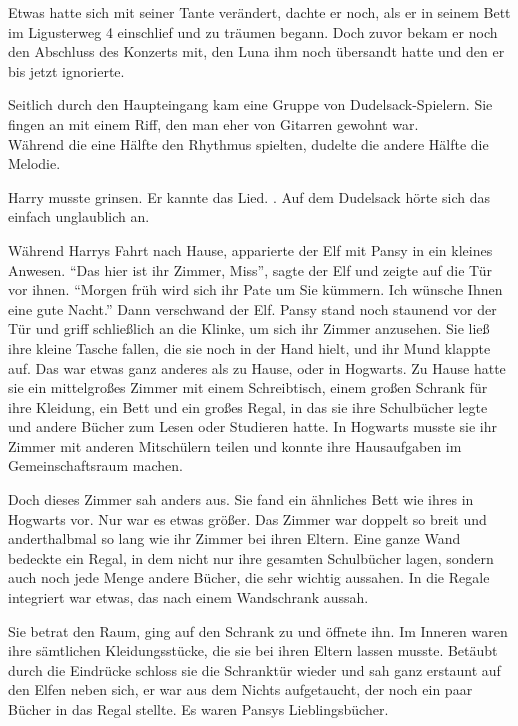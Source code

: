 Etwas hatte sich mit seiner Tante verändert, dachte er noch, als er in seinem Bett im Ligusterweg 4 einschlief und zu träumen begann. Doch zuvor bekam er noch den Abschluss des Konzerts mit, den Luna ihm noch übersandt hatte und den er bis jetzt ignorierte.

\begin{rueckblick}
Seitlich durch den Haupteingang kam eine Gruppe von Dudelsack-Spielern. Sie fingen an mit einem Riff, den man eher von Gitarren gewohnt war.\\
Während die eine Hälfte den Rhythmus spielten, dudelte die andere Hälfte die Melodie.
\end{rueckblick}

Harry musste grinsen. Er kannte das Lied. . Auf dem Dudelsack hörte sich das einfach unglaublich an.

\trenn

Während Harrys Fahrt nach Hause, apparierte der Elf mit Pansy in ein kleines Anwesen. \enquote{Das hier ist ihr Zimmer, Miss}, sagte der Elf und zeigte auf die Tür vor ihnen. \enquote{Morgen früh wird sich ihr Pate um Sie kümmern. Ich wünsche Ihnen eine gute Nacht.} Dann verschwand der Elf. Pansy stand noch staunend vor der Tür und griff schließlich an die Klinke, um sich ihr Zimmer anzusehen. Sie ließ ihre kleine Tasche fallen, die sie noch in der Hand hielt, und ihr Mund klappte auf. Das war etwas ganz anderes als zu Hause, oder in Hogwarts. Zu Hause hatte sie ein mittelgroßes Zimmer mit einem Schreibtisch, einem großen Schrank für ihre Kleidung, ein Bett und ein großes Regal, in das sie ihre Schulbücher legte und andere Bücher zum Lesen oder Studieren hatte. In Hogwarts musste sie ihr Zimmer mit anderen Mitschülern teilen und konnte ihre Hausaufgaben im Gemeinschaftsraum machen.

Doch dieses Zimmer sah anders aus. Sie fand ein ähnliches Bett wie ihres in Hogwarts vor. Nur war es etwas größer. Das Zimmer war doppelt so breit und anderthalbmal so lang wie ihr Zimmer bei ihren Eltern. Eine ganze Wand bedeckte ein Regal, in dem nicht nur ihre gesamten Schulbücher lagen, sondern auch noch jede Menge andere Bücher, die sehr wichtig aussahen. In die Regale integriert war etwas, das nach einem Wandschrank aussah.

Sie betrat den Raum, ging auf den Schrank zu und öffnete ihn. Im Inneren waren ihre sämtlichen Kleidungsstücke, die sie bei ihren Eltern lassen musste. Betäubt durch die Eindrücke schloss sie die Schranktür wieder und sah ganz erstaunt auf den Elfen neben sich, er war aus dem Nichts aufgetaucht, der noch ein paar Bücher in das Regal stellte. Es waren Pansys Lieblingsbücher.

